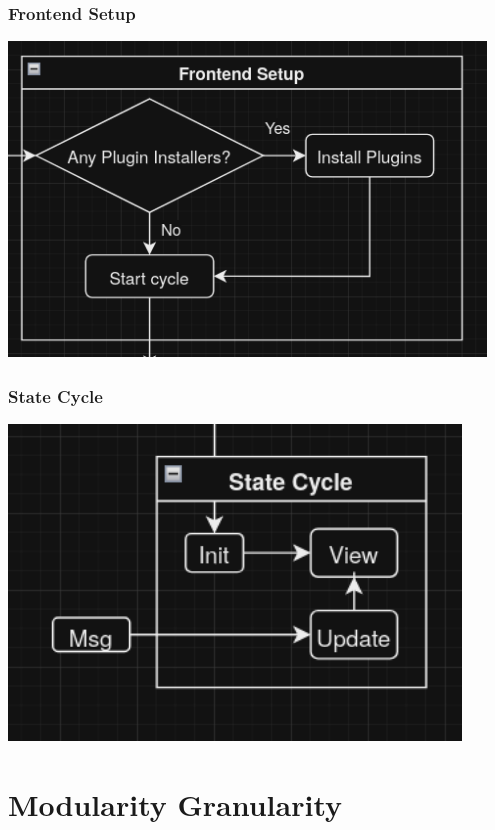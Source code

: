 \documentclass{beamer}
\begin{document}
\begin{frame}
  \frametitle{Frontend Setup}
  \centering
  \includegraphics[width=0.95\textwidth]{./pics/frontend-setup.png}
\end{frame}

\begin{frame}
  \frametitle{State Cycle}
  \centering
  \includegraphics[width=0.9\textwidth]{./pics/state-cycle.png}
\end{frame}

\section{Modularity  Granularity}
\SectionPage
\end{document}
